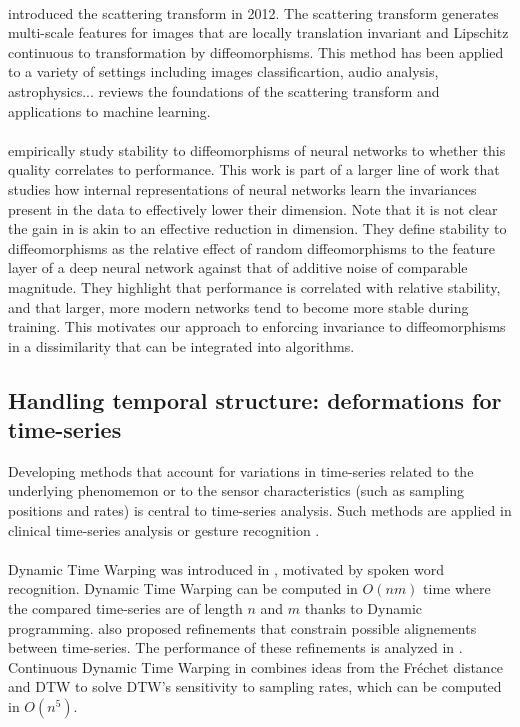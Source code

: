 \paragraph{}
\citet{mallat-scattering} introduced the scattering transform in 2012. The scattering transform generates multi-scale features for images that are locally translation invariant and Lipschitz continuous to transformation by diffeomorphisms. This method has been applied to a variety of settings including images classificartion, audio analysis, astrophysics... \citet{bruna-book} reviews the foundations of the scattering transform and applications to machine learning.

\paragraph{}
\citet{wyartdiffeo} empirically study stability to diffeomorphisms of neural networks to whether this quality correlates to performance. This work is part of a larger line of work that studies how internal representations of neural networks learn the invariances present in the data to effectively lower their dimension. Note that it is not clear the gain in \cite{bietti} is akin to an effective reduction in dimension. They define stability to diffeomorphisms as the relative effect of random diffeomorphisms to the feature layer of a deep neural network against that of additive noise of comparable magnitude. They highlight that performance is correlated with relative stability, and that larger, more modern networks tend to become more stable during training. This motivates our approach to enforcing invariance to diffeomorphisms in a dissimilarity that can be integrated into algorithms.

\subsection{Handling temporal structure: deformations for time-series}
\label{background:diffytw}

Developing methods that account for variations in time-series related to the underlying phenomemon or to the sensor characteristics (such as sampling positions and rates) is central to time-series analysis. Such methods are applied in clinical time-series analysis \citep{oh-invariances-clinical,ortiz-ieee} or gesture recognition \citep{dtw-gesture}.

\paragraph{} Dynamic Time Warping was introduced in \cite{dtw}, motivated by spoken word recognition. Dynamic Time Warping can be computed in $O(nm)$ time where the compared time-series are of length $n$ and $m$ thanks to Dynamic programming. \citep{dtw} also proposed refinements that constrain possible alignements between time-series. The performance of these refinements is analyzed in \cite{dtw-baseline-1}. Continuous Dynamic Time Warping in \cite{cdtw} combines ideas from the Fréchet distance and DTW to solve DTW's sensitivity to sampling rates, which can be computed in $O(n^5)$.

